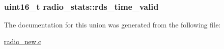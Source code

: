 \subsubsection[{rds\+\_\+time\+\_\+valid}]{\setlength{\rightskip}{0pt plus 5cm}uint16\+\_\+t radio\+\_\+stats\+::rds\+\_\+time\+\_\+valid}\label{unionradio__stats_a21299b2eaacb96dcffe4324c347a665f}


The documentation for this union was generated from the following file\+:\begin{DoxyCompactItemize}
\item 
\hyperlink{radio__new_8c}{radio\+\_\+new.\+c}\end{DoxyCompactItemize}
